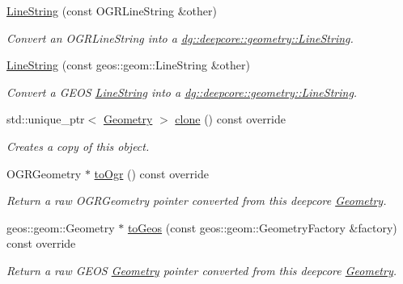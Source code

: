 \begin{DoxyCompactItemize}
\hyperlink{structdg_1_1deepcore_1_1geometry_1_1_line_string_a0313be896800a300ddd04f7590cc2a67}{Line\+String} (const O\+G\+R\+Line\+String \&other)
\begin{DoxyCompactList}\small\item\em Convert an O\+G\+R\+Line\+String into a \hyperlink{structdg_1_1deepcore_1_1geometry_1_1_line_string}{dg\+::deepcore\+::geometry\+::\+Line\+String}. \end{DoxyCompactList}\item 
\hyperlink{structdg_1_1deepcore_1_1geometry_1_1_line_string_af40bfc4b07df9fb35d9b0fc2fd37078c}{Line\+String} (const geos\+::geom\+::\+Line\+String \&other)
\begin{DoxyCompactList}\small\item\em Convert a G\+E\+OS \hyperlink{structdg_1_1deepcore_1_1geometry_1_1_line_string}{Line\+String} into a \hyperlink{structdg_1_1deepcore_1_1geometry_1_1_line_string}{dg\+::deepcore\+::geometry\+::\+Line\+String}. \end{DoxyCompactList}\item 
std\+::unique\+\_\+ptr$<$ \hyperlink{structdg_1_1deepcore_1_1geometry_1_1_geometry}{Geometry} $>$ \hyperlink{structdg_1_1deepcore_1_1geometry_1_1_line_string_a99e55ce0ceec4e7c0a2244901ef84b11}{clone} () const override
\begin{DoxyCompactList}\small\item\em Creates a copy of this object. \end{DoxyCompactList}\item 
O\+G\+R\+Geometry $\ast$ \hyperlink{structdg_1_1deepcore_1_1geometry_1_1_line_string_a71fe2d5dfc2381d1e0af80021938a36e}{to\+Ogr} () const override
\begin{DoxyCompactList}\small\item\em Return a raw O\+G\+R\+Geometry pointer converted from this deepcore \hyperlink{structdg_1_1deepcore_1_1geometry_1_1_geometry}{Geometry}. \end{DoxyCompactList}\item 
geos\+::geom\+::\+Geometry $\ast$ \hyperlink{structdg_1_1deepcore_1_1geometry_1_1_line_string_adecb72091949f58f473c0becaee189d6}{to\+Geos} (const geos\+::geom\+::\+Geometry\+Factory \&factory) const override
\begin{DoxyCompactList}\small\item\em Return a raw G\+E\+OS \hyperlink{structdg_1_1deepcore_1_1geometry_1_1_geometry}{Geometry} pointer converted from this deepcore \hyperlink{structdg_1_1deepcore_1_1geometry_1_1_geometry}{Geometry}. \end{DoxyCompactList}\item 

\end{DoxyCompactItemize}
